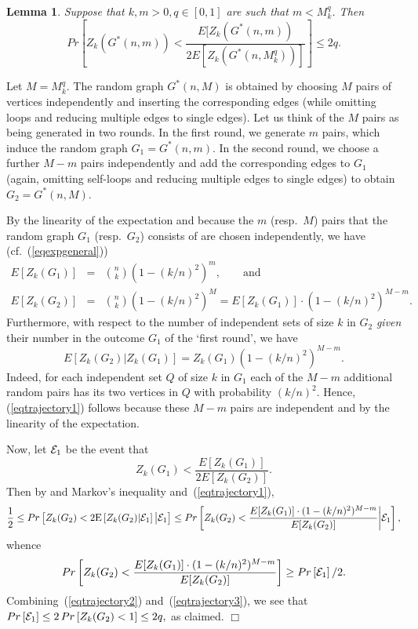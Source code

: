 \documentclass[a4paper,10pt]{article}
\makeatletter
\newtheorem{lemma}{Lemma}\renewcommand{\thelemma}{\arabic{lemma}}
\newenvironment{proof}{\noindent{\bf Proof\@:}}{\hfill $\Box$\\}
\newcommand\cE{\mathcal{E}}
\def\cE{{\cal E}}
\newcommand\Erw{\mathrm{E}}
\newcommand{\bink}[2] {{{#1}\choose {#2}}}
\newcommand\brk[1]{\left\lbrack{#1}\right\rbrack}
\makeatother
\begin{document}
\begin{lemma}\label{lemma:concentration-1}
Suppose that $k,m>0,q\in\brk{0,1}$ are such that $m<M^q_k$. Then
\begin{displaymath}
Pr\left[Z_k(G^*(n,m))<\frac{ E[Z_k(G^*(n,m))}{2E[Z_k(G^*(n,M^q_k))]} \right]\leq 2 q.
\end{displaymath}
\end{lemma}
\begin{proof}
Let $M=M^q_k$. The random graph $G^*(n,M)$ is obtained by choosing
$M$ pairs of vertices independently	and inserting the corresponding
edges (while omitting loops and reducing multiple edges to single edges).
Let us think of the $M$ pairs as being generated in two rounds.
In the first round, we generate $m$ pairs, which induce the
random graph $G_1=G^*(n,m)$. In the second round, we choose a
further $M-m$ pairs independently and add the corresponding edges
to $G_1$ (again, omitting self-loops and reducing multiple edges
to single edges) to obtain $G_2=G^*(n,M)$.

By the linearity of the expectation and because the $m$ (resp.\ $M$)
pairs that the random graph $G_1$ (resp.\ $G_2$) consists of are
chosen independently, we have  (cf.~(\ref{eqexpgeneral}))
	\begin{eqnarray}\nonumber
	E\brk{Z_k(G_1)}&=&\bink nk(1-(k/n)^2)^m,\qquad\mbox{and}\\
	E\brk{Z_k(G_2)}&=&\bink nk(1-(k/n)^2)^M=E\brk{Z_k(G_1)}\cdot(1-(k/n)^2)^{M-m}.
		\label{eqtrajectory3}
	\end{eqnarray}
Furthermore, with respect to the 	number of independent sets of
size $k$ in $G_2$ \emph{given} their number in the outcome $G_1$
of the `first round', we have
	\begin{equation}\label{eqtrajectory1}
	E[Z_k(G_2)|Z_k(G_1)]=Z_k(G_1)(1-(k/n)^2)^{M-m}.
	\end{equation}
Indeed, for each independent set $Q$ of size $k$ in $G_1$ each of
the $M-m$ additional random pairs has its two vertices in $Q$ with
probability $(k/n)^2$. Hence, (\ref{eqtrajectory1}) follows because
these $M-m$ pairs are independent and by the linearity of the expectation.

\noindent
Now, let $\cE_1$ be the event that
	$$Z_k(G_1)<\frac{E[Z_k(G_1)]}{2E[Z_k(G_2)]}.$$
Then by and Markov's inequality and~(\ref{eqtrajectory1}),
	\begin{eqnarray*}
	\frac12\leq Pr\left[Z_k(G_2)<2\Erw\brk{Z_k(G_2)|\cE_1} \big| {\cal E}_1\right]
	\leq Pr\left[Z_k(G_2)<\frac{E[Z_k(G_1)]\cdot(1-(k/n)^2)^{M-m}}{E[Z_k(G_2)]} \bigg| {\cal E}_1\right],
	\end{eqnarray*}
whence
	\begin{eqnarray}\label{eqtrajectory2}
	Pr\left[Z_k(G_2)<\frac{E[Z_k(G_1)]\cdot(1-(k/n)^2)^{M-m}}{E[Z_k(G_2)]}\right]\geq Pr\brk{\cE_1}/2.
	\end{eqnarray}
Combining~(\ref{eqtrajectory2}) and~(\ref{eqtrajectory3}), we see that
	$Pr\brk{\cE_1}\leq2\,Pr\left[Z_k(G_2)<1\right]\leq 2q,$
as claimed.
\end{proof}
\end{document}
